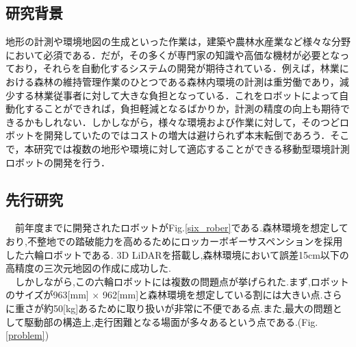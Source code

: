 \subsection{研究背景}
\par 地形の計測や環境地図の生成といった作業は，建築や農林水産業など様々な分野において必須である．だが，その多くが専門家の知識や高価な機材が必要となっており，それらを自動化するシステムの開発が期待されている．例えば，林業における森林の維持管理作業のひとつである森林内環境の計測は重労働であり，減少する林業従事者に対して大きな負担となっている．これをロボットによって自動化することができれば，負担軽減となるばかりか，計測の精度の向上も期待できるかもしれない．しかしながら，様々な環境および作業に対して，そのつどロボットを開発していたのではコストの増大は避けられず本末転倒であろう．そこで，本研究では複数の地形や環境に対して適応することができる移動型環境計測ロボットの開発を行う．

\subsection{先行研究}
\ \ 前年度までに開発されたロボットがFig.\ref{six_rober}である.森林環境を想定しており,不整地での踏破能力を高めるためにロッカーボギーサスペンションを採用した六輪ロボットである.
3D LiDARを搭載し,森林環境において誤差15cm以下の高精度の三次元地図の作成に成功した.\cite{arita}\\
\ \ しかしながら,この六輪ロボットには複数の問題点が挙げられた.まず,ロボットのサイズが963[mm] $\times$ 962[mm]と森林環境を想定している割には大きい点.さらに重さが約50[kg]あるために取り扱いが非常に不便である点.また,最大の問題として駆動部の構造上,走行困難となる場面が多々あるという点である.(Fig.\ref{problem})


